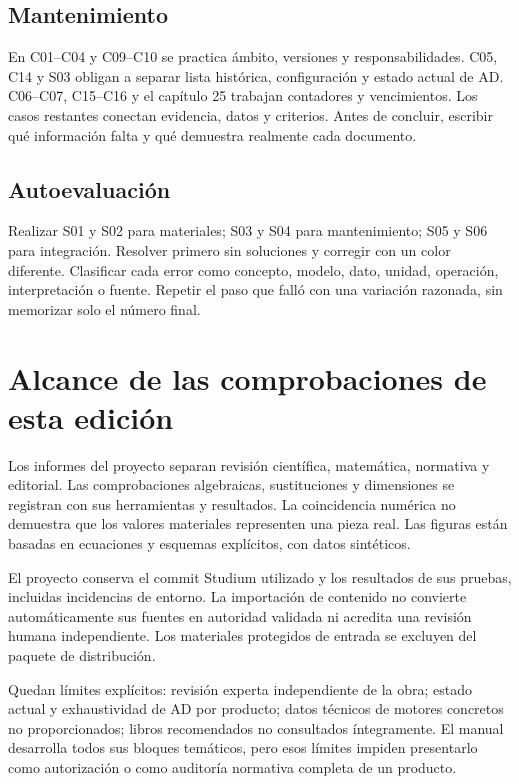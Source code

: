 \section{Mantenimiento}
En C01--C04 y C09--C10 se practica ámbito, versiones y responsabilidades. C05, C14 y S03 obligan a separar lista histórica, configuración y estado actual de AD. C06--C07, C15--C16 y el capítulo 25 trabajan contadores y vencimientos. Los casos restantes conectan evidencia, datos y criterios. Antes de concluir, escribir qué información falta y qué demuestra realmente cada documento.
\section{Autoevaluación}
Realizar S01 y S02 para materiales; S03 y S04 para mantenimiento; S05 y S06 para integración. Resolver primero sin soluciones y corregir con un color diferente. Clasificar cada error como concepto, modelo, dato, unidad, operación, interpretación o fuente. Repetir el paso que falló con una variación razonada, sin memorizar solo el número final.
\chapter{Alcance de las comprobaciones de esta edición}
Los informes del proyecto separan revisión científica, matemática, normativa y editorial. Las comprobaciones algebraicas, sustituciones y dimensiones se registran con sus herramientas y resultados. La coincidencia numérica no demuestra que los valores materiales representen una pieza real. Las figuras están basadas en ecuaciones y esquemas explícitos, con datos sintéticos.

El proyecto conserva el commit Studium utilizado y los resultados de sus pruebas, incluidas incidencias de entorno. La importación de contenido no convierte automáticamente sus fuentes en autoridad validada ni acredita una revisión humana independiente. Los materiales protegidos de entrada se excluyen del paquete de distribución.

Quedan límites explícitos: revisión experta independiente de la obra; estado actual y exhaustividad de AD por producto; datos técnicos de motores concretos no proporcionados; libros recomendados no consultados íntegramente. El manual desarrolla todos sus bloques temáticos, pero esos límites impiden presentarlo como autorización o como auditoría normativa completa de un producto.
